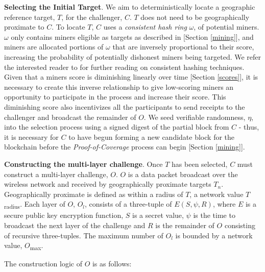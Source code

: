 \documentclass[10pt, nonatbib, nocopyrightspace, reprint]{sigplanconf}
\begin{document}
\textbf{Selecting the Initial Target}. We aim to deterministically locate a geographic reference target, $T$, for the challenger, $C$. $T$ does not need to be geographically proximate to $C$. To locate $T$, $C$ uses a \emph{consistent hash ring} $\omega$, of potential miners. $\omega$ only contains miners eligible as targets as described in [Section \ref{mining}], and miners are allocated portions of $\omega$ that are inversely proportional to their score, increasing the probability of potentially dishonest miners being targeted. We refer the interested reader to \cite{hashing} for further reading on consistent hashing techniques. Given that a miners score is diminishing linearly over time [Section \ref{scores}], it is necessary to create this inverse relationship to give low-scoring miners an opportunity to participate in the process and increase their score. This diminishing score also incentivizes all the participants to send receipts to the challenger and broadcast the remainder of $O$. We seed verifiable randomness, $\eta$, into the selection process using a signed digest of the partial block from $C$ - thus, it is necessary for $C$ to have begun forming a new candidate block for the blockchain before the \emph{Proof-of-Coverage} process can begin [Section \ref{mining}].

\textbf{Constructing the multi-layer challenge}. Once $T$ has been selected, $C$ must construct a multi-layer challenge, $O$. $O$ is a data packet broadcast over the wireless network and received by geographically proximate targets $T_n$. Geographically proximate is defined as within a radius of $T$, a network value $T$\textsubscript{radius}. Each layer of $O$, $O_l$, consists of a three-tuple of $E\left(S, \psi, R\right)$, where $E$ is a secure public key encryption function, $S$ is a secret value, $\psi$ is the time to broadcast the next layer of the challenge and $R$ is the remainder of $O$ consisting of recursive three-tuples. The maximum number of $O_l$ is bounded by a network value, $O$\textsubscript{max}. 

The construction logic of $O$ is as follows:
\end{document}
